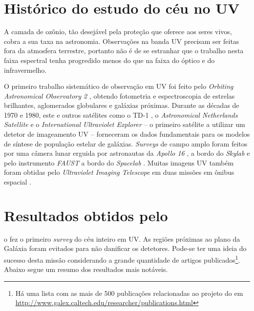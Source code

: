 \section{Histórico do estudo do céu no UV}
\label{sec:Galex:CeuUV}

A camada de ozônio, tão desejável pela proteção que oferece aos seres vivos,
cobra a sua taxa na astronomia. Observações na banda UV precisam ser feitas fora
da atmosfera terrestre, portanto não é de se estranhar que o trabalho nesta
faixa espectral tenha progredido menos do que na faixa do óptico e do
infravermelho.\citneed

O primeiro trabalho sistemático de observação em UV foi feito pelo {\em Orbiting
Astronomical Observatory 2} \citep{Code1970}, obtendo fotometria e
espectroscopia de estrelas brilhantes, aglomerados globulares e galáxias
próximas. Durante as décadas de 1970 e 1980, este e outros satélites como o TD-1
\citep{Boksenberg1973}, o {\em Astronomical Netherlands Satellite}
\citep{vanDuinen1975} e o {\em International Ultraviolet Explorer}
\citep{Kondo1987} -- o primeiro satélite a utilizar um detetor de imageamento UV
-- forneceram os dados fundamentais para os modelos de síntese de população
estelar de galáxias. {\em Surveys} de campo amplo foram feitos por uma câmera
lunar erguida por astronautas da {\em Apollo 16} \citep{Carruthers1973}, a bordo
do {\em Skylab} \citep{Henize1975} e pelo instrumento {\em FAUST} a bordo do
{\em Spacelab} \citep{Bowyer1993}. Muitas imagens UV também foram obtidas pelo
{\em Ultraviolet Imaging Telescope} em duas missões em ônibus espacial
\citep{Stecher1997}.



\section{Resultados obtidos pelo \galex}
\label{sec:Galex:Resultados}

o \galex fez o primeiro {\em survey} do céu inteiro em UV. As regiões próximas
ao plano da Galáxia foram evitados para não danificar os detetores. Pode-se ter
uma ideia do sucesso desta missão considerando a grande quantidade de artigos
publicados\footnote{Há uma lista com as mais de 500 publicações relacionadas ao
projeto do \galex em
\url{http://www.galex.caltech.edu/researcher/publications.html}}. Abaixo segue
um resumo dos resultados mais notáveis.

